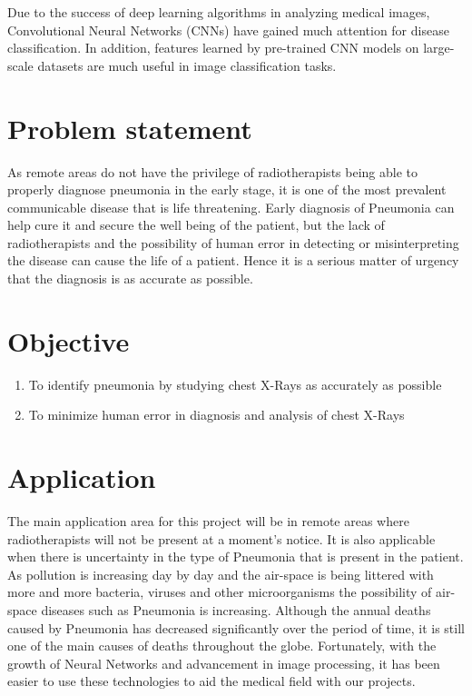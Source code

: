 \documentclass[12pt, a4paper]{report}
\begin{document}
Due to the success of deep learning algorithms in analyzing medical images, Convolutional Neural Networks (CNNs) have gained much attention for disease classification. In addition, features learned by pre-trained CNN models on large-scale datasets are much useful in image classification tasks.

\section{Problem statement}

As remote areas do not have the privilege of radiotherapists being able to properly diagnose pneumonia in the early stage, it is one of the most prevalent communicable disease that is life threatening. Early diagnosis of Pneumonia can help cure it and secure the well being of the patient, but the lack of radiotherapists and the possibility of human error in detecting or misinterpreting the disease can cause the life of a patient. Hence it is a serious matter of urgency that the diagnosis is as accurate as possible.

\section{Objective}
\begin{enumerate}
\item   To identify pneumonia by studying chest X-Rays as accurately as possible
\item	To minimize human error in diagnosis and analysis of chest X-Rays
\end{enumerate}

\section{Application}
The main application area for this project will be in remote areas where radiotherapists will not be present at a moment’s notice. It is also applicable when there is uncertainty in the type of Pneumonia that is present in the patient. As pollution is increasing day by day and the air-space is being littered with more and more bacteria, viruses and other microorganisms the possibility of air-space diseases such as Pneumonia is increasing. Although the annual deaths caused by Pneumonia has decreased significantly over the period of time, it is still one of the main causes of deaths throughout the globe. Fortunately, with the growth of Neural Networks and advancement in image processing, it has been easier to use these technologies to aid the medical field with our projects.
\end{document}
